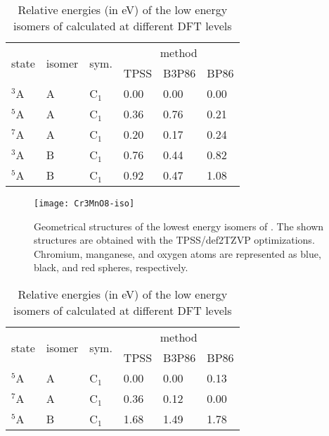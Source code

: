 \begin{table}[]
	\centering
	\caption{Relative energies (in eV) of the low energy isomers of  calculated at different DFT levels}
\begin{tabular}{@{}llllll@{}}
\toprule
\multirow{2}{*}{state} & \multirow{2}{*}{isomer} & \multirow{2}{*}{sym.} & \multicolumn{3}{c}{method} \\ \cmidrule(l){4-6} 
         &        &         & TPSS   & B3P86 & BP86   \\ \midrule
$^3$A    & A      & C$_1$   & 0.00   & 0.00  & 0.00 \\
$^5$A    & A      & C$_1$   & 0.36   & 0.76  & 0.21 \\
$^7$A    & A      & C$_1$   & 0.20   & 0.17  & 0.24 \\
$^3$A    & B      & C$_1$   & 0.76   & 0.44  & 0.82 \\
$^5$A    & B      & C$_1$   & 0.92   & 0.47  & 1.08 \\ \bottomrule
\end{tabular}
\label{tbl:Cr3MnO8}
\end{table}	



\begin{figure}
	\centering
	\texttt{[image: Cr3MnO8-iso]}
	\caption{Geometrical structures of the lowest energy isomers of . The shown structures are obtained with the TPSS/def2TZVP optimizations. Chromium, manganese, and oxygen atoms are represented as blue, black, and red spheres, respectively.}
	\label{figs:Cr3MnO8}
\end{figure}





\begin{table}[]
	\centering
	\caption{Relative energies (in eV) of the low energy isomers of  calculated at different DFT levels}
\begin{tabular}{@{}llllll@{}}
\toprule
\multirow{2}{*}{state} & \multirow{2}{*}{isomer} & \multirow{2}{*}{sym.} & \multicolumn{3}{c}{method} \\ \cmidrule(l){4-6} 
         &        &         & TPSS   & B3P86 & BP86   \\ \midrule
$^5$A    & A      & C$_1$   & 0.00   & 0.00  & 0.13 \\
$^7$A    & A      & C$_1$   & 0.36   & 0.12  & 0.00 \\
$^5$A    & B      & C$_1$   & 1.68   & 1.49  & 1.78 \\ \bottomrule
\end{tabular}
\label{tbl:Cr3MnO9}
\end{table}	




